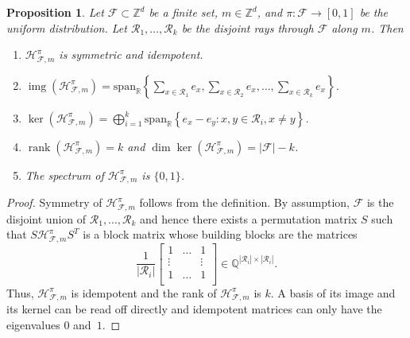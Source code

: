 \documentclass[11pt]{amsart}
\newtheorem{prop}[thm]{Proposition}
\theoremstyle{definition}
\numberwithin{equation}{section}
\newcommand{\ring}[1]{\ensuremath{\mathbb{#1}}}
\renewcommand{\>}{\rangle}
\newcommand{\<}{\langle}
\newcommand{\0}{\mathbf{0}}
\newcommand{\1}{\mathbf{1}}
\newcommand{\2}{\mathbf{2}}
\newcommand\QQ{\ring{Q}}
\newcommand\RR{\ring{R}}
\newcommand\ZZ{\ring{Z}}
\newcommand\cF{{\mathcal F}}
\newcommand\cR{{\mathcal R}}
\DeclareMathOperator\rank{rank} %
\DeclareMathOperator\img{img} %
\newcommand{\heatbathmove}[3]{\mathcal{H}^{#1}_{#2,#3}}
\newcommand{\spann}[1]{\mathrm{span}_\RR\left\{#1\right\}}
\begin{document}
\begin{prop}\label{p:MoveMatrix}
Let $\cF\subset\ZZ^d$ be a finite set, $m\in\ZZ^d$, and $\pi:\cF\to[0,1]$
be the uniform distribution. Let $\cR_1,\dots,\cR_k$ be the disjoint
rays through $\cF$ along $m$. Then
\begin{enumerate}
\item $\heatbathmove{\pi}{\cF}{m}$ is symmetric and idempotent.
\item
$\img(\heatbathmove{\pi}{\cF}{m})=\spann{\sum_{x\in\cR_1}e_x,\sum_{x\in\cR_2}e_x,\dots,\sum_{x\in\cR_k}e_x}$.
\item $\ker(\heatbathmove{\pi}{\cF}{m})=\bigoplus_{i=1}^k\spann{e_x-e_y:
x,y\in\cR_i, x\neq y}$.
\item $\rank(\heatbathmove{\pi}{\cF}{m})=k$ and
$\dim\ker(\heatbathmove{\pi}{\cF}{m})=|\cF|-k$.
\item The spectrum of $\heatbathmove{\pi}{\cF}{m}$ is $\{0,1\}$.
\end{enumerate}
\end{prop}
\begin{proof}
Symmetry of $\heatbathmove{\pi}{\cF}{m}$ follows from the
definition. By assumption, $\cF$ is the disjoint union of
$\cR_1,\dots,\cR_k$ and hence there exists a permutation matrix
$S$ such that $S\heatbathmove{\pi}{\cF}{m}S^T$ is a block matrix whose
building blocks are the matrices 
\begin{equation*}
\frac{1}{|\cR_i|}\begin{bmatrix}
1 & \dots & 1 \\ 
\vdots & & \vdots \\ 
1 & \dots & 1 \\ 
\end{bmatrix}\in\QQ^{|\cR_i|\times|\cR_i|}.
\end{equation*}
Thus, $\heatbathmove{\pi}{\cF}{m}$ is
idempotent and the rank of $\heatbathmove{\pi}{\cF}{m}$ is $k$. A basis
of its image and its kernel can be read off directly and
idempotent matrices can only have the eigenvalues $0$ and~$1$. 
\end{proof}
\end{document}
